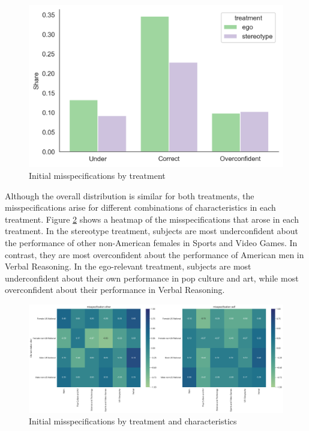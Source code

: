 \documentclass[
  12pt,
]{article}
\begin{document}
\begin{figure}
\hypertarget{fig:misspecification-hist}{%
\centering
\includegraphics{../figures/misspecification_hist.png}
\caption{Initial misspecifications by
treatment}\label{fig:misspecification-hist}
}
\end{figure}

Although the overall distribution is similar for both treatments, the
misspecifications arise for different combinations of characteristics in
each treatment. Figure \ref{fig:misspecification-by-treatment} shows a
heatmap of the misspecifications that arose in each treatment. In the
stereotype treatment, subjects are most underconfident about the
performance of other non-American females in Sports and Video Games. In
contrast, they are most overconfident about the performance of American
men in Verbal Reasoning. In the ego-relevant treatment, subjects are
most underconfident about their own performance in pop culture and art,
while most overconfident about their performance in Verbal Reasoning.

\begin{figure}
\hypertarget{fig:misspecification-by-treatment}{%
\centering
\includegraphics{../figures/misspecifications_characteristics_treatment.png}
\caption{Initial misspecifications by treatment and
characteristics}\label{fig:misspecification-by-treatment}
}
\end{figure}
\end{document}
